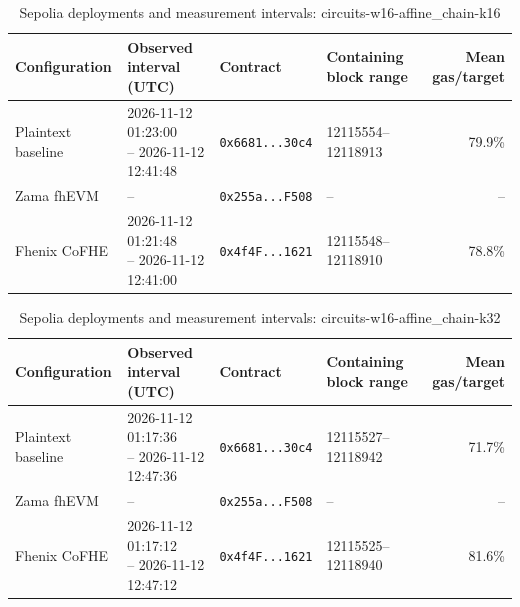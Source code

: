 \begin{table}[!t]
\caption{Sepolia deployments and measurement intervals: circuits-w16-affine\_chain-k16}
\label{tab:sepolia-circuits-w16-affine-chain-k16}
\centering
\footnotesize
\setlength{\tabcolsep}{4pt}
\begin{tabular}{|l|l|l|l|r|}
\hline
\textbf{Configuration} & \textbf{Observed interval (UTC)} & \textbf{Contract} & \textbf{Containing block range} & \textbf{Mean gas/target} \\
\hline
Plaintext baseline & \shortstack[l]{2026-11-12 01:23:00 \\ -- 2026-11-12 12:41:48} & \texttt{0x6681...30c4} & 12115554--12118913 & 79.9\% \\
\hline
Zama fhEVM & -- & \texttt{0x255a...F508} & -- & -- \\
\hline
Fhenix CoFHE & \shortstack[l]{2026-11-12 01:21:48 \\ -- 2026-11-12 12:41:00} & \texttt{0x4f4F...1621} & 12115548--12118910 & 78.8\% \\
\hline
\end{tabular}
\end{table}

\begin{table}[!t]
\caption{Sepolia deployments and measurement intervals: circuits-w16-affine\_chain-k32}
\label{tab:sepolia-circuits-w16-affine-chain-k32}
\centering
\footnotesize
\setlength{\tabcolsep}{4pt}
\begin{tabular}{|l|l|l|l|r|}
\hline
\textbf{Configuration} & \textbf{Observed interval (UTC)} & \textbf{Contract} & \textbf{Containing block range} & \textbf{Mean gas/target} \\
\hline
Plaintext baseline & \shortstack[l]{2026-11-12 01:17:36 \\ -- 2026-11-12 12:47:36} & \texttt{0x6681...30c4} & 12115527--12118942 & 71.7\% \\
\hline
Zama fhEVM & -- & \texttt{0x255a...F508} & -- & -- \\
\hline
Fhenix CoFHE & \shortstack[l]{2026-11-12 01:17:12 \\ -- 2026-11-12 12:47:12} & \texttt{0x4f4F...1621} & 12115525--12118940 & 81.6\% \\
\hline
\end{tabular}
\end{table}

